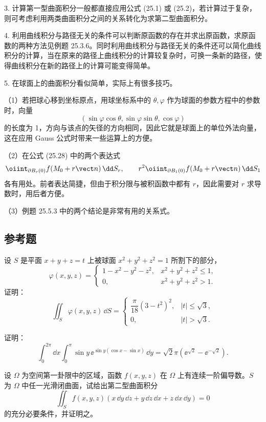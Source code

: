 3. 计算第一型曲面积分一般都直接应用公式 (25.1) 或 (25.2)，若计算过于复杂，则可考虑利用两类曲面积分之间的关系转化为求第二型曲面积分。

4. 利用曲线积分与路径无关的条件可以判断原函数的存在并求出原函数，求原函数的两种方法见例题 25.3.6。同时利用曲线积分与路径无关的条件还可以简化曲线积分的计算，当在原来的路径上曲线积分的计算较复杂时，可换一条新的路径，使得曲线积分在新的路径上的计算可能变得简单。

5. 在球面上的曲面积分看似简单，实际上有很多技巧。

（1）若把球心移到坐标原点，用球坐标系中的 $\theta,\varphi$ 作为球面的参数方程中的参数时，向量
\[
  (\sin\varphi\cos\theta,\sin\varphi\sin\theta,\cos\varphi)
\]
的长度为 1，方向与该点的矢径的方向相同，因此它就是球面上的单位外法向量，这在应用 Gauss 公式时带来一些运算上的方便。

（2）在公式 (25.28) 中的两个表达式
\[
  \oiint_{\partial B_r(0)}f(M_0+r\vect n)\,\dd S_r,
  \qquad
  r^2\oiint_{\partial B_1(0)}f(M_0+r\vect n)\,\dd S_1
\]
各有用处。前者表达简捷，但由于积分限与被积函数中都有 $r$，因此需要对 $r$ 求导数时，用后者方便。

（3）例题 25.5.3 中的两个结论是非常有用的关系式。

\subsection{参考题}

\begin{xreferenceproblem}[1]
设 $S$ 是平面 $x+y+z=t$ 上被球面 $x^2+y^2+z^2=1$ 所割下的部分，
\[
  \varphi(x,y,z)=
  \begin{cases}
    1-x^2-y^2-z^2,&x^2+y^2+z^2\le1,\\
    0,&x^2+y^2+z^2>1.
  \end{cases}
\]
证明：
\[
  \iint_S\varphi(x,y,z)\,\dd S=
  \begin{cases}
  \dfrac\pi{18}(3-t^2)^2,&|t|\le\sqrt3,\\
  0,&|t|>\sqrt3.
  \end{cases}
\]
\end{xreferenceproblem}

\begin{xreferenceproblem}[2]
证明：
\[
  \int_0^{2\pi}\dd x\int_0^\pi\sin y\,\ee^{\sin y(\cos x-\sin x)}\,\dd y
  =\sqrt2\pi(\ee^{\sqrt2}-\ee^{-\sqrt2}).
\]
\end{xreferenceproblem}

\begin{xreferenceproblem}[3]
设 $\Omega$ 为空间第一卦限中的区域，函数 $f(x,y,z)$ 在 $\Omega$ 上有连续一阶偏导数。$S$ 为 $\Omega$ 中任一光滑闭曲面，试给出第二型曲面积分
\[
  \iint_S f(x,y,z)(x\,\dd y\,\dd z+y\,\dd z\,\dd x+z\,\dd x\,\dd y)=0
\]
的充分必要条件，并证明之。
\end{xreferenceproblem}

